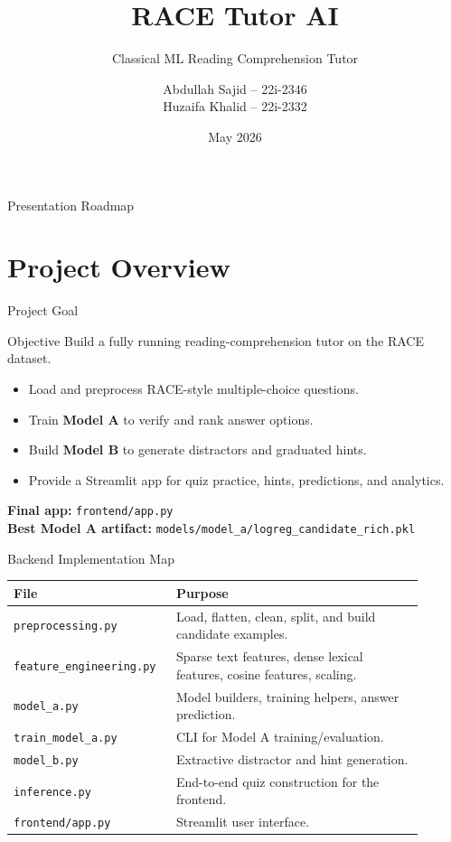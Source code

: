 \documentclass[aspectratio=169,11pt]{beamer}
\title[RACE Tutor AI]{RACE Tutor AI}
\subtitle{Classical ML Reading Comprehension Tutor}
\author[Abdullah Sajid \& Huzaifa Khalid]{
Abdullah Sajid \;--\; 22i-2346\\
Huzaifa Khalid \;--\; 22i-2332
}
\date{May 2026}
\begin{document}
\begin{frame}
    \titlepage
\end{frame}

\begin{frame}{Presentation Roadmap}
    \tableofcontents
\end{frame}

\section{Project Overview}

\begin{frame}{Project Goal}
    \begin{block}{Objective}
        Build a fully running reading-comprehension tutor on the RACE dataset.
    \end{block}

    \begin{itemize}
        \item Load and preprocess RACE-style multiple-choice questions.
        \item Train \textbf{Model A} to verify and rank answer options.
        \item Build \textbf{Model B} to generate distractors and graduated hints.
        \item Provide a Streamlit app for quiz practice, hints, predictions, and analytics.
    \end{itemize}

    \vspace{0.2cm}
    \textbf{Final app:} \texttt{frontend/app.py}\\
    \textbf{Best Model A artifact:} \texttt{models/model\_a/logreg\_candidate\_rich.pkl}
\end{frame}

\begin{frame}{Backend Implementation Map}
    \begin{tabular}{p{0.32\linewidth} p{0.58\linewidth}}
        \toprule
        \textbf{File} & \textbf{Purpose} \\
        \midrule
        \texttt{preprocessing.py} & Load, flatten, clean, split, and build candidate examples. \\
        \texttt{feature\_engineering.py} & Sparse text features, dense lexical features, cosine features, scaling. \\
        \texttt{model\_a.py} & Model builders, training helpers, answer prediction. \\
        \texttt{train\_model\_a.py} & CLI for Model A training/evaluation. \\
        \texttt{model\_b.py} & Extractive distractor and hint generation. \\
        \texttt{inference.py} & End-to-end quiz construction for the frontend. \\
        \texttt{frontend/app.py} & Streamlit user interface. \\
        \bottomrule
    \end{tabular}
\end{frame}
\end{document}
